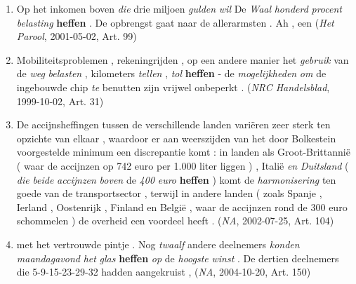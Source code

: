 \documentclass[
]{book}
\begin{document}
\begin{enumerate}
\def\labelenumi{(\arabic{enumi})}
\setcounter{enumi}{14}
\item
  Op het inkomen boven \emph{die} drie miljoen \emph{gulden} \emph{wil} De \emph{Waal} \emph{honderd} \emph{procent} \emph{belasting} \textbf{heffen} . De opbrengst gaat naar de allerarmsten . Ah , een (\emph{Het Parool}, 2001-05-02, Art. 99)
\item
  Mobiliteitsproblemen , rekeningrijden , op een andere manier het \emph{gebruik} van de \emph{weg} \emph{belasten} , kilometers \emph{tellen} , \emph{tol} \textbf{heffen} - de \emph{mogelijkheden} \emph{om} de ingebouwde chip \emph{te} benutten zijn vrijwel onbeperkt . (\emph{NRC Handelsblad}, 1999-10-02, Art. 31)
\item
  De accijnsheffingen tussen de verschillende landen variëren zeer sterk ten opzichte van elkaar , waardoor er aan weerszijden van het door Bolkestein voorgestelde minimum een discrepantie komt : in landen als Groot-Brittannië ( waar de accijnzen op 742 euro per 1.000 liter liggen ) , Italië \emph{en} \emph{Duitsland} ( \emph{die} \emph{beide} \emph{accijnzen} \emph{boven} de \emph{400} \emph{euro} \textbf{heffen} ) komt de \emph{harmonisering} ten goede van de transportsector , terwijl in andere landen ( zoals Spanje , Ierland , Oostenrijk , Finland en België , waar de accijnzen rond de 300 euro schommelen ) de overheid een voordeel heeft . (\emph{NA}, 2002-07-25, Art. 104)
\item
  met het vertrouwde pintje . Nog \emph{twaalf} andere deelnemers \emph{konden} \emph{maandagavond} \emph{het} \emph{glas} \textbf{heffen} \emph{op} de \emph{hoogste} \emph{winst} . De dertien deelnemers die 5-9-15-23-29-32 hadden aangekruist , (\emph{NA}, 2004-10-20, Art. 150)
\end{enumerate}
\end{document}

